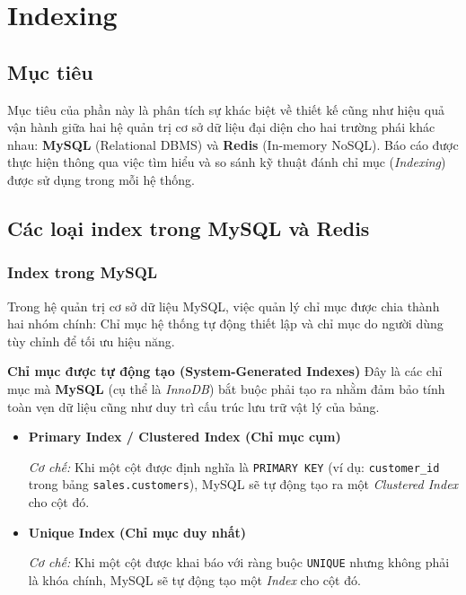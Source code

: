 ﻿\section{Indexing}

\subsection{Mục tiêu}
Mục tiêu của phần này là phân tích sự khác biệt về thiết kế cũng như hiệu quả vận hành giữa hai hệ quản trị cơ sở dữ liệu
đại diện cho hai trường phái khác nhau: \textbf{MySQL} (Relational DBMS) và
\textbf{Redis} (In-memory NoSQL). Báo cáo được thực hiện thông qua việc
tìm hiểu và so sánh kỹ thuật đánh chỉ mục (\textit{Indexing}) được sử dụng
trong mỗi hệ thống.



\subsection{Các loại index trong MySQL và Redis}

\subsubsection{Index trong MySQL}

Trong hệ quản trị cơ sở dữ liệu MySQL, việc quản lý chỉ mục được chia thành hai nhóm chính: 
Chỉ mục hệ thống tự động thiết lập và chỉ mục do người dùng tùy chỉnh để tối ưu hiệu năng.

\vspace{1em}

\textbf{ Chỉ mục được tự động tạo (System-Generated Indexes)} Đây là các chỉ mục mà \textbf{MySQL} (cụ thể là \textit{InnoDB}) bắt buộc phải tạo ra 
nhằm đảm bảo tính toàn vẹn dữ liệu cũng như duy trì cấu trúc lưu trữ vật lý của bảng.

\begin{itemize}

\item \textbf{Primary Index / Clustered Index (Chỉ mục cụm)}

\textit{Cơ chế:} Khi một cột được định nghĩa là \texttt{PRIMARY KEY}
(ví dụ: \texttt{customer\_id} trong bảng \texttt{sales.customers}),
MySQL sẽ tự động tạo ra một \textit{Clustered Index} cho cột đó.


\item \textbf{Unique Index (Chỉ mục duy nhất)}

\textit{Cơ chế:} Khi một cột được khai báo với ràng buộc \texttt{UNIQUE} nhưng không 
phải là khóa chính, MySQL sẽ tự động tạo một \textit{Index} cho cột đó.


\end{itemize}


